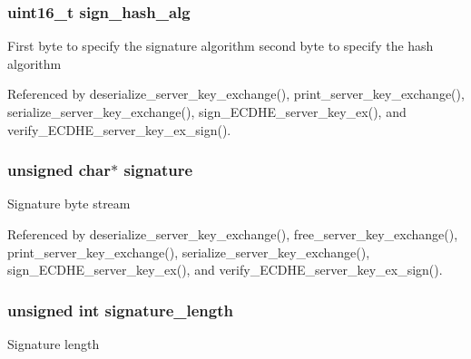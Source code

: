 \subsubsection[{\texorpdfstring{sign\+\_\+hash\+\_\+alg}{sign_hash_alg}}]{\setlength{\rightskip}{0pt plus 5cm}uint16\+\_\+t sign\+\_\+hash\+\_\+alg}\hypertarget{structecdhe__server__key__exchange__t_a07ea01aadbb81f38a9a27e324d11f54e}{}\label{structecdhe__server__key__exchange__t_a07ea01aadbb81f38a9a27e324d11f54e}
First byte to specify the signature algorithm second byte to specify the hash algorithm 

Referenced by deserialize\+\_\+server\+\_\+key\+\_\+exchange(), print\+\_\+server\+\_\+key\+\_\+exchange(), serialize\+\_\+server\+\_\+key\+\_\+exchange(), sign\+\_\+\+E\+C\+D\+H\+E\+\_\+server\+\_\+key\+\_\+ex(), and verify\+\_\+\+E\+C\+D\+H\+E\+\_\+server\+\_\+key\+\_\+ex\+\_\+sign().

\subsubsection[{\texorpdfstring{signature}{signature}}]{\setlength{\rightskip}{0pt plus 5cm}unsigned char$\ast$ signature}\hypertarget{structecdhe__server__key__exchange__t_a775505f2a74638cda44fdd79c4e07993}{}\label{structecdhe__server__key__exchange__t_a775505f2a74638cda44fdd79c4e07993}
Signature byte stream 

Referenced by deserialize\+\_\+server\+\_\+key\+\_\+exchange(), free\+\_\+server\+\_\+key\+\_\+exchange(), print\+\_\+server\+\_\+key\+\_\+exchange(), serialize\+\_\+server\+\_\+key\+\_\+exchange(), sign\+\_\+\+E\+C\+D\+H\+E\+\_\+server\+\_\+key\+\_\+ex(), and verify\+\_\+\+E\+C\+D\+H\+E\+\_\+server\+\_\+key\+\_\+ex\+\_\+sign().

\subsubsection[{\texorpdfstring{signature\+\_\+length}{signature_length}}]{\setlength{\rightskip}{0pt plus 5cm}unsigned int signature\+\_\+length}\hypertarget{structecdhe__server__key__exchange__t_a23a683d5129246d9adbd0029612d06a8}{}\label{structecdhe__server__key__exchange__t_a23a683d5129246d9adbd0029612d06a8}
Signature length 

